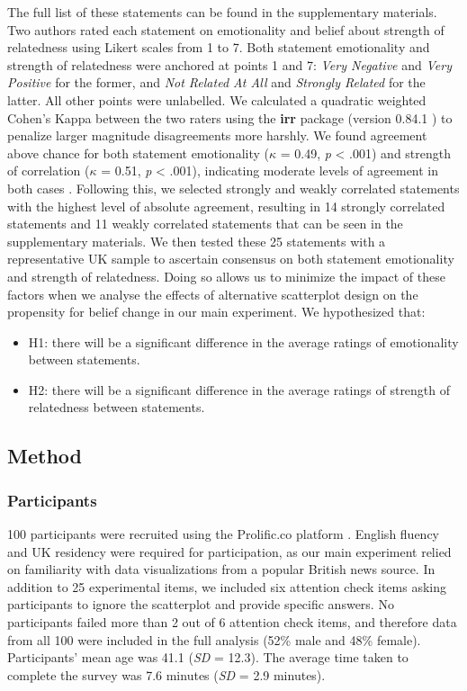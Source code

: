 \documentclass[manuscript,screen,review,anonymous]{acmart}
\providecommand{\tightlist}{%
  \setlength{\itemsep}{0pt}\setlength{\parskip}{0pt}}\usepackage{longtable,booktabs,array}
\begin{document}
The full list of these statements can be found in the supplementary
materials. Two authors rated each statement on emotionality and belief
about strength of relatedness using Likert scales from 1 to 7. Both
statement emotionality and strength of relatedness were anchored at
points 1 and 7: \emph{Very Negative} and \emph{Very Positive} for the
former, and \emph{Not Related At All} and \emph{Strongly Related} for
the latter. All other points were unlabelled. We calculated a quadratic
weighted Cohen's Kappa between the two raters using the \textbf{irr}
package (version 0.84.1 \citep{irr}) to penalize larger magnitude
disagreements more harshly. We found agreement above chance for both
statement emotionality (\(\kappa\) = 0.49, \emph{p} \textless{} .001)
and strength of correlation (\(\kappa\) = 0.51, \emph{p} \textless{}
.001), indicating moderate levels of agreement in both cases
\citep{cohen_1968, fleiss_1969}. Following this, we selected strongly
and weakly correlated statements with the highest level of absolute
agreement, resulting in 14 strongly correlated statements and 11 weakly
correlated statements that can be seen in the supplementary materials.
We then tested these 25 statements with a representative UK sample to
ascertain consensus on both statement emotionality and strength of
relatedness. Doing so allows us to minimize the impact of these factors
when we analyse the effects of alternative scatterplot design on the
propensity for belief change in our main experiment. We hypothesized
that:

\begin{itemize}
\tightlist
\item
  H1: there will be a significant difference in the average ratings of
  emotionality between statements.
\item
  H2: there will be a significant difference in the average ratings of
  strength of relatedness between statements.
\end{itemize}

\subsection{Method}\label{sec-method-pre}

\subsubsection{Participants}\label{sec-participants-pre}

100 participants were recruited using the Prolific.co platform
\citep{prolific}. English fluency and UK residency were required for
participation, as our main experiment relied on familiarity with data
visualizations from a popular British news source. In addition to 25
experimental items, we included six attention check items asking
participants to ignore the scatterplot and provide specific answers. No
participants failed more than 2 out of 6 attention check items, and
therefore data from all 100 were included in the full analysis (52\%
male and 48\% female). Participants' mean age was 41.1 (\emph{SD} =
12.3). The average time taken to complete the survey was 7.6 minutes
(\emph{SD} = 2.9 minutes).
\end{document}
